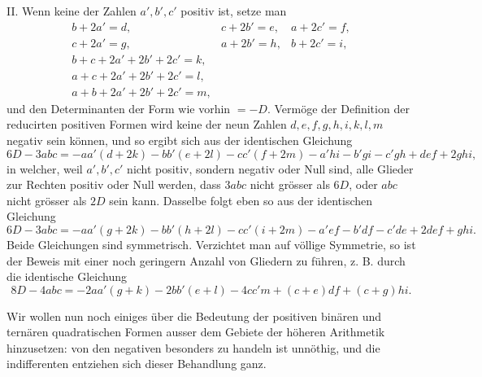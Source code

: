 \documentclass[12pt]{article}
\begin{document}
II. Wenn keine der Zahlen $a',b',c'$ positiv ist, setze man
\[
\begin{array}{lll}
b+2a'=d, & c+2b'=e, & a+2c'=f,\\
c+2a'=g, & a+2b'=h, & b+2c'=i,\\[2pt]
b+c+2a'+2b'+2c'=k,\\
a+c+2a'+2b'+2c'=l,\\
a+b+2a'+2b'+2c'=m,
\end{array}
\]
und den Determinanten der Form wie vorhin $=-D$. Vermöge der Definition der reducirten positiven Formen wird keine der neun Zahlen $d,e,f,g,h,i,k,l,m$ negativ sein können, und so ergibt sich aus der identischen Gleichung
\[
6D-3abc=-aa'(d+2k)-bb'(e+2l)-cc'(f+2m)-a'hi-b'gi-c'gh+def+2ghi,
\]
in welcher, weil $a',b',c'$ nicht positiv, sondern negativ oder Null sind, alle Glieder zur Rechten positiv oder Null werden, dass $3abc$ nicht grösser als $6D$, oder $abc$ nicht grösser als $2D$ sein kann. Dasselbe folgt eben so aus der identischen Gleichung
\[
6D-3abc=-aa'(g+2k)-bb'(h+2l)-cc'(i+2m)-a'ef-b'df-c'de+2def+ghi.
\]
Beide Gleichungen sind symmetrisch. Verzichtet man auf völlige Symmetrie, so ist der Beweis mit einer noch geringern Anzahl von Gliedern zu führen, z. B. durch die identische Gleichung
\[
8D-4abc=-2aa'(g+k)-2bb'(e+l)-4cc'm+(c+e)df+(c+g)hi.
\]

Wir wollen nun noch einiges über die Bedeutung der positiven binären und ternären quadratischen Formen ausser dem Gebiete der höheren Arithmetik hinzusetzen: von den negativen besonders zu handeln ist unnöthig, und die indifferenten entziehen sich dieser Behandlung ganz.
\end{document}

